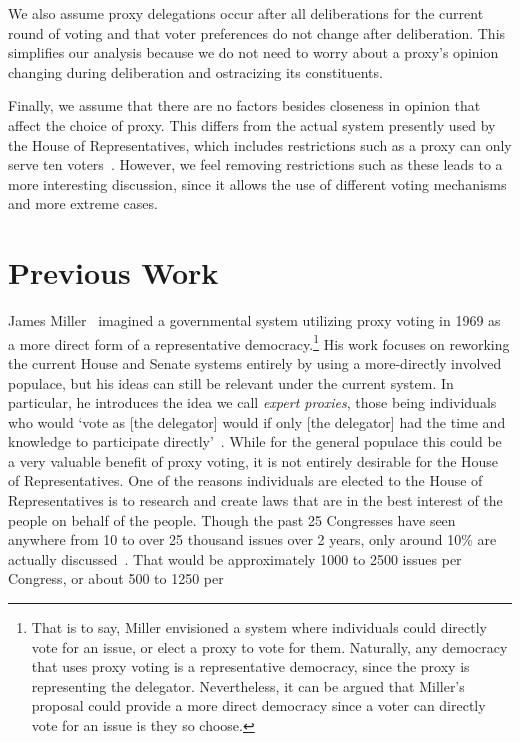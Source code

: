 We also assume proxy delegations occur after all deliberations for the current round of
voting and that voter preferences do not change after deliberation.
This simplifies our analysis because we do not need to worry about a proxy's opinion
changing during deliberation and ostracizing its constituents.

Finally, we assume that there are no factors besides closeness in opinion that affect
the choice of proxy.
This differs from the actual system presently used by the House of Representatives,
which includes restrictions such as a proxy can only serve ten voters~\cite{CERP2020}.
However, we feel removing restrictions such as these leads to a more interesting
discussion, since it allows the use of different voting mechanisms and more extreme
cases.


\section{Previous Work}\label{sec:previous-work}
James Miller~\cite{Miller1969} imagined a governmental system utilizing proxy voting
in 1969 as a more direct form of a representative democracy.\footnote{
    That is to say, Miller envisioned a system where individuals could directly vote
    for an issue, or elect a proxy to vote for them.
    Naturally, any democracy that uses proxy voting is a representative democracy,
    since the proxy is representing the delegator.
    Nevertheless, it can be argued that Miller's proposal could provide a more direct
    democracy since a voter can directly vote for an issue is they so choose.
}
His work focuses on reworking the current House and Senate systems entirely by using a
more-directly involved populace, but his ideas can still be relevant under the current
system.
In particular, he introduces the idea we call \textit{expert proxies},
those being individuals who would `vote as [the delegator] would if only
[the delegator] had the time and knowledge to participate directly'~\cite{Miller1969}.
While for the general populace this could be a very valuable benefit of proxy voting,
it is not entirely desirable for the House of Representatives.
One of the reasons individuals are elected to the House of Representatives is to
research and create laws that are in the best interest of the people on behalf of
the people.
Though the past 25 Congresses have seen anywhere from 10 to over 25 thousand issues
over 2 years, only around 10\% are actually discussed~\cite{GovTrack2022}.
That would be approximately 1000 to 2500 issues per Congress, or about 500 to 1250 per
